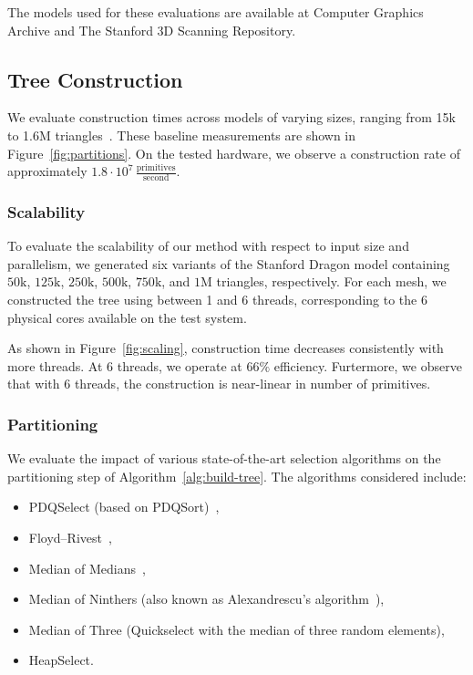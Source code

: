 The models used for these evaluations are available at
Computer Graphics Archive\cite{McGuire2017Data} and
The Stanford 3D Scanning Repository\cite{stanford3dscanrep}.


\subsection{Tree Construction} \label{sec:eval-cons}

We evaluate construction times across models of varying sizes,
ranging from 15k to 1.6M triangles~\cite{trueform}. These baseline
measurements are shown in Figure~\ref{fig:partitions}. On the
tested hardware, we observe a construction rate of approximately
$1.8 \cdot 10^7 \,\frac{\mathrm{primitives}}{\mathrm{second}}$.

\subsubsection{Scalability}

To evaluate the scalability of our method with respect to input
size and parallelism, we generated six variants of the Stanford
Dragon model containing $50\text{k}$, $125\text{k}$, $250\text{k}$,
$500\text{k}$, $750\text{k}$, and $1\text{M}$ triangles,
respectively. For each mesh, we constructed the tree using
between 1 and 6 threads, corresponding to the 6 physical cores
available on the test system.

As shown in Figure~\ref{fig:scaling}, construction time decreases
consistently with more threads. At 6 threads, we operate at
$66\%$ efficiency. Furtermore, we observe that with $6$
threads, the construction is near-linear in number
of primitives.

\subsubsection{Partitioning}\label{sec:eval-partitions}

We evaluate the impact of various state-of-the-art selection
algorithms on the partitioning step of
Algorithm~\ref{alg:build-tree}. The algorithms considered include:

\begin{itemize}
  \item PDQSelect (based on PDQSort)~\cite{pdqSort},
  \item Floyd–Rivest~\cite{floyd1975expected},
  \item Median of Medians~\cite{mom},
  \item Median of Ninthers (also known as Alexandrescu’s
        algorithm~\cite{alexandrescu-sorting}),
  \item Median of Three (Quickselect with the median of three
        random elements),
  \item HeapSelect.
\end{itemize}


